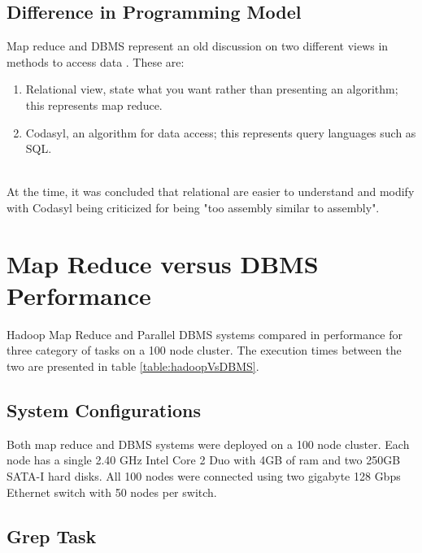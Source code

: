 \documentclass[10pt,twocolumn]{IEEEtran11}
\begin{document}
\subsection{Difference in Programming Model}
Map reduce and DBMS represent an old discussion on two different views in methods to access data \cite{pavlo2009comparison}.  These are:
\  \\
\begin{enumerate}
	\setlength\itemsep{1em}
	\item Relational view, state what you want rather than presenting an algorithm; this represents map reduce.
	\item Codasyl, an algorithm for data access; this represents query languages such as SQL.
\end{enumerate} 
\  \\
At the time, it was concluded that relational are easier to understand and modify with Codasyl being criticized for being "too assembly similar to assembly".  

\section{Map Reduce versus DBMS Performance} \label{mrVSDBMSSection}

Hadoop Map Reduce and Parallel DBMS systems compared in performance for three category of tasks on a 100 node cluster.  The execution times between the two are presented in table \ref{table:hadoopVsDBMS}.  

\subsection{System Configurations}
Both map reduce and DBMS systems were deployed on a 100 node cluster.  Each node has a single 2.40 GHz Intel Core 2 Duo with 4GB of ram and two 250GB SATA-I hard disks.  All 100 nodes were connected using two gigabyte 128 Gbps Ethernet switch with 50 nodes per switch.

\subsection{Grep Task}
\end{document}
